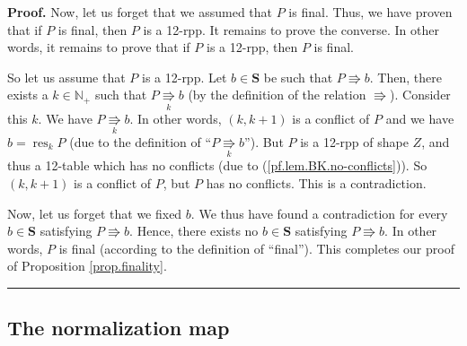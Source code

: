 \documentclass[numbers=enddot,12pt,final,onecolumn,notitlepage]{scrartcl}%
\theoremstyle{definition}
\newenvironment{proof}[1][Proof]{\noindent\textbf{#1.} }{\ \rule{0.5em}{0.5em}}
\newenvironment{verlong}{}{}
\begin{document}
\begin{verlong}
\begin{proof}
Now, let us forget that we assumed that $P$ is final. Thus, we have proven
that if $P$ is final, then $P$ is a 12-rpp. It remains to prove the converse.
In other words, it remains to prove that if $P$ is a 12-rpp, then $P$ is final.

So let us assume that $P$ is a 12-rpp. Let $b\in\mathbf{S}$ be such that
$P\Rrightarrow b$. Then, there exists a $k\in\mathbb{N}_{+}$ such that
$P\underset{k}{\Rrightarrow}b$ (by the definition of the relation
$\Rrightarrow$). Consider this $k$. We have $P\underset{k}{\Rrightarrow}b$. In
other words, $\left(  k,k+1\right)  $ is a conflict of $P$ and we have
$b=\operatorname*{res}\nolimits_{k}P$ (due to the definition of
\textquotedblleft$P\underset{k}{\Rrightarrow}b$\textquotedblright). But $P$ is
a 12-rpp of shape $Z$, and thus a 12-table which has no conflicts (due to
(\ref{pf.lem.BK.no-conflicts})). So $\left(  k,k+1\right)  $ is a conflict of
$P$, but $P$ has no conflicts. This is a contradiction.

Now, let us forget that we fixed $b$. We thus have found a contradiction for
every $b\in\mathbf{S}$ satisfying $P\Rrightarrow b$. Hence, there exists no
$b\in\mathbf{S}$ satisfying $P\Rrightarrow b$. In other words, $P$ is final
(according to the definition of \textquotedblleft final\textquotedblright).
This completes our proof of Proposition \ref{prop.finality}.
\end{proof}
\end{verlong}

\subsection{The normalization map}
\end{document}
